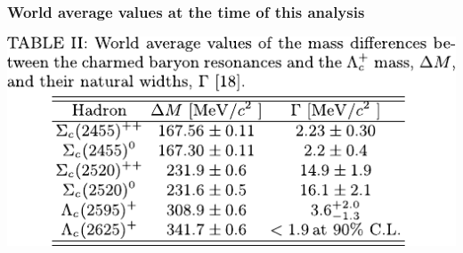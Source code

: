 \documentclass[10pt]{beamer}
\begin{document}
\begin{frame}[label=intro]
\end{frame}%

\begin{frame}[label=prev-exp]%
  \frametitle{World average values at the time of this analysis}
  \centering
  \includegraphics[width=.8\textwidth]{figures/001/table-ii}

\end{frame}%
\end{document}
